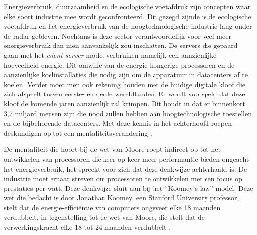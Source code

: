 Energieverbruik, duurzaamheid en de ecologische voetafdruk zijn concepten waar elke soort industrie mee wordt geconfronteerd. Dit gezegd zijnde is de ecologische voetafdruk en het energieverbruik van de hoogtechnologische industrie lang onder de radar gebleven. Nochtans is deze sector verantwoordelijk voor veel meer energieverbruik dan men aanvankelijk zou inschatten. De servers die gepaard gaan met het \textit{client-server} model verbruiken namelijk een aanzienlijke hoeveelheid energie. Dit omwille van de energie hongerige processoren en de aanzienlijke koelinstallaties die nodig zijn om de apparatuur in datacenters af te koelen. Verder moet men ook rekening houden met de huidige digitale kloof die zich afspeelt tussen eerste- en derde wereldlanden. Er wordt voorspeld dat deze kloof de komende jaren aanzienlijk zal krimpen. Dit houdt in dat er binnenkort 3,7 miljard mensen zijn die nood zullen hebben aan hoogtechnologische toestellen en de bijbehorende datacenters. Met deze kennis in het achterhoofd roepen deskundigen op tot een mentaliteitsverandering \autocite{Aitken2021}.


De mentaliteit die hoort bij de wet van Moore roept indirect op tot het ontwikkelen van processoren die keer op keer meer performantie bieden ongeacht het energieverbruik, het spreekt voor zich dat deze denkwijze achterhaald is. De industrie moet ernaar streven om processoren te ontwikkelen met een focus op prestaties per watt. Deze denkwijze sluit aan bij het “Koomey’s law” model. Deze wet die bedacht is door Jonathan Koomey, een Stanford University professor, stelt dat de energie-efficiëntie van computers ongeveer elke 18 maanden verdubbelt, in tegenstelling tot de wet van Moore, die stelt dat de verwerkingskracht elke 18 tot 24 maanden verdubbelt \autocite{Koomey2011}.

